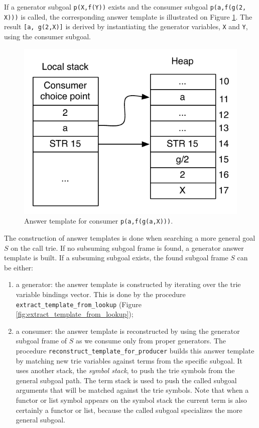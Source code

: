 If a generator subgoal \texttt{p(X,f(Y))} exists and the consumer subgoal \texttt{p(a,f(g(2, X)))}
is called, the corresponding answer template is illustrated on Figure \ref{fig:answer_template_consumer}.
The result \texttt{[a,~g(2,X)]} is derived by instantiating the generator variables,
\texttt{X} and \texttt{Y}, using the consumer subgoal.

\begin{figure}[ht]
  \centering
    \includegraphics[scale=0.6]{answer_template_consumer.pdf}
  \caption{Answer template for consumer \texttt{p(a,f(g(a,X)))}.}
  \label{fig:answer_template_consumer}
\end{figure}

The construction of answer templates is done when searching a more general goal $S$ on the call trie.
If no subsuming subgoal frame is found, a generator answer template is built. If a subsuming subgoal
exists, the found subgoal frame $S$ can be either:

\begin{enumerate}
  \item a generator: the answer template is constructed by iterating over the trie variable bindings vector. This is done
  by the procedure \texttt{extract\_template\_from\_lookup} (Figure \ref{fig:extract_template_from_lookup});
  \item a consumer: the answer template is reconstructed by using the generator subgoal frame of $S$
  as we consume only from proper generators. 
  The procedure \texttt{reconstruct\_template\_for\_producer} builds this answer template by
  matching new trie variables against terms from the specific subgoal. It
  uses another stack, the \textit{symbol stack}, to push the trie
  symbols from the general subgoal path. The term stack is used to push the called subgoal arguments that
  will be matched against the trie symbols. Note that when a functor or list symbol appears
  on the symbol stack the current term is also certainly a functor or list, because the called subgoal
  specializes the more general subgoal.
\end{enumerate}

